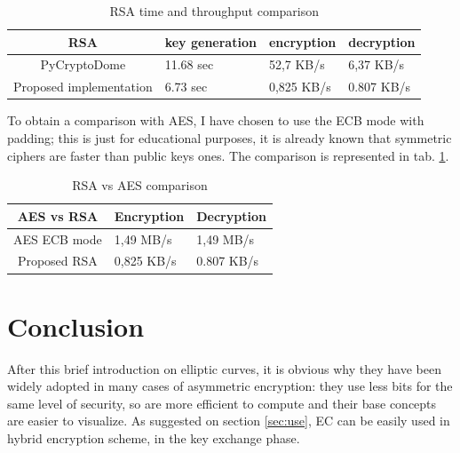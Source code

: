 \documentclass{article}
\begin{document}
\renewcommand{\arraystretch}{2}

\begin{table}[H]
	\begin{center}
		\begin{tabular}{ |c || m{2cm} | m{2cm} | m{2cm}|  }
			\hline
			RSA & key \linebreak generation & encryption & decryption \\ [0.5ex] 
			\hline\hline
			PyCryptoDome & 11.68 sec & 52,7 KB/s & 6,37 KB/s \\ 
			\hline
			Proposed implementation & 6.73 sec & 0,825 KB/s & 0.807 KB/s \\ 
			\hline
		\end{tabular}
		\caption{RSA time and throughput comparison}
		\label{tab:RSA}
	\end{center}
\end{table}

To obtain a comparison with AES, I have chosen to use the ECB mode with padding; this is just for educational purposes, it is already known that symmetric ciphers are faster than public keys ones. The comparison is represented in tab. \ref{tab:RSA}.

\begin{table}[h]
	\begin{center}
		\begin{tabular}{ | c || m{2cm} | m{2cm} | }
			\hline
			AES vs RSA & Encryption & Decryption \\ [0.5ex] 
			\hline\hline
			AES ECB mode & 1,49 MB/s & 1,49 MB/s  \\ 
			\hline
			Proposed RSA & 0,825 KB/s & 0.807 KB/s \\ 
			\hline
		\end{tabular}
		\caption{RSA vs AES comparison}
		\label{tab:AES}
	\end{center}
\end{table}

\section{Conclusion}

After this brief introduction on elliptic curves, it is obvious why they have been widely adopted in many cases of asymmetric encryption: they use less bits for the same level of security, so are more efficient to compute and their base concepts are easier to visualize. As suggested on section \ref{sec:use}, EC can be easily used in hybrid encryption scheme, in the key exchange phase.






\end{document}
